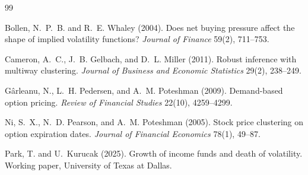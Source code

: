 \documentclass[11pt]{article}
\begin{document}
\begin{thebibliography}{99}

Bollen, N.~P.~B. and R.~E. Whaley (2004).
Does net buying pressure affect the shape of implied volatility functions?
\emph{Journal of Finance} 59(2), 711--753.

Cameron, A.~C., J.~B. Gelbach, and D.~L. Miller (2011).
Robust inference with multiway clustering.
\emph{Journal of Business and Economic Statistics} 29(2), 238--249.

G\^{a}rleanu, N., L.~H. Pedersen, and A.~M. Poteshman (2009).
Demand-based option pricing.
\emph{Review of Financial Studies} 22(10), 4259--4299.

Ni, S.~X., N.~D. Pearson, and A.~M. Poteshman (2005).
Stock price clustering on option expiration dates.
\emph{Journal of Financial Economics} 78(1), 49--87.

Park, T. and U.~Kurucak (2025).
Growth of income funds and death of volatility.
Working paper, University of Texas at Dallas.

\end{thebibliography}
\end{document}
